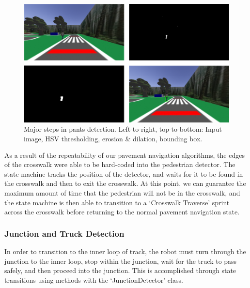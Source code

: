 \documentclass[titlepage, twocolumn]{article}
\begin{document}
            \begin{figure}
                \includegraphics[width=\linewidth]{pants.png}
                \caption{Major steps in pants detection. Left-to-right, top-to-bottom: Input image, HSV thresholding, erosion \& dilation, bounding box.}
                \label{fig:pants}
            \end{figure}

            As a result of the repeatability of our pavement navigation algorithms, the edges of the crosswalk were able to be hard-coded into the pedestrian detector. The state machine tracks the position of the detector, and waits for it to be found in the crosswalk and then to exit the crosswalk. At this point, we can guarantee the maximum amount of time that the pedestrian will not be in the crosswalk, and the state machine is then able to transition to a `Crosswalk Traverse' sprint across the crosswalk before returning to the normal pavement navigation state. 
            
        \subsubsection{Junction and Truck Detection}
            In order to transition to the inner loop of track, the robot must turn through the junction to the inner loop, stop within the junction, wait for the truck to pass safely, and then proceed into the junction. This is accomplished through state transitions using methods with the `JunctionDetector' class.
\end{document}
